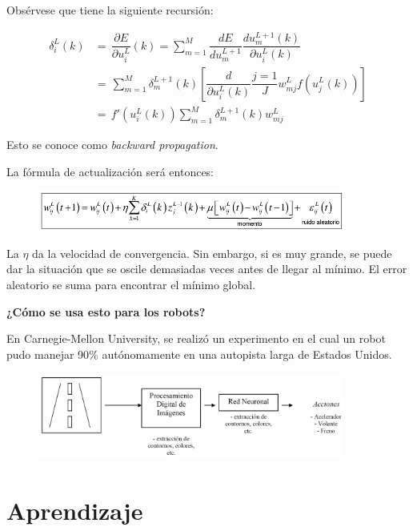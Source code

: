 Obsérvese que tiene la siguiente recursión:


\begin{equation*}
	\begin{aligned}
		 \delta_i^L (k) & = \, \dfrac{\partial E}{\partial u_{i}^L }(k) = \sum_{m=1}^{M} \dfrac{dE}{du_m^{L+1}} \dfrac{du_m^{L+1} (k)}{\partial u_i^L (k)}  \\
		& = \,\sum_{m=1}^{M} \delta_m^{L+1} (k) \left[ \dfrac{d}{\partial u_i^L (k)} \dfrac{j=1}{J} w_{mj}^L f (u_j^L (k)) \right] \\
		& = \, f'(u_i^L(k)) \sum_{m=1}^{M} \delta_m^{L+1} (k) w_{mj}^L 
	\end{aligned}
\end{equation*}

Esto se conoce como \textit{backward propagation}.

La fórmula de actualización será entonces:
\begin{figure}[h!]
	\centering
	\includegraphics[width=0.9\textwidth]{images/img79_f.png}
	\label{figura79_f}
\end{figure}

La $\eta$ da la velocidad de convergencia. Sin embargo, si es muy grande, se puede dar la situación que se oscile
demasiadas veces antes de llegar al mínimo.
El error aleatorio se suma para encontrar el mínimo global.

\textbf{¿Cómo se usa esto para los robots?}

En Carnegie-Mellon University, se realizó un experimento en el cual un robot pudo manejar 90\% autónomamente en una autopista larga de Estados Unidos.

\begin{figure}[h!]
	\centering
	\includegraphics[width=0.9\textwidth]{images/img80.png}
	\label{figura80}
\end{figure}


\section{Aprendizaje}

